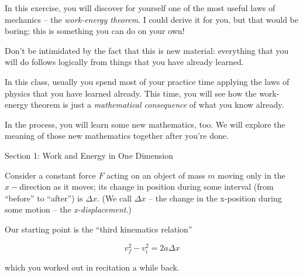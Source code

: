 \documentclass[12pt]{article}
\begin{document}

\centerline{\Large {}}


In this exercise, you will discover for yourself one of the most useful laws of mechanics -- the {\it work-energy theorem}. I could derive it for you, but that would be boring; this is something you can do on your own!



Don't be intimidated by the fact that this is new material: everything that you will do follows logically from things that you have already learned.

In this class, usually you spend most of your practice time applying the laws of physics that you have learned already. This time, you will see how the work-energy theorem is just a {\it mathematical consequence} of what you know already. 

In the process, you will learn some new mathematics, too. We will explore the meaning of those new mathematics together after you're done.
\bigskip
\bigskip\newpage

{\Large Section 1: Work and Energy in One Dimension}

Consider a constant force $F$ acting on an object of mass $m$ moving only in the $x-$direction as it moves; its change in position during some interval (from ``before'' to ``after'') is $\Delta x$. (We call $\Delta x$ -- the change in the x-position during some 
motion -- the {\it x-displacement}.)

Our starting point is the ``third kinematics relation''

$$ v_f^2 - v_i^2 = 2 a \Delta x$$

which you worked out in recitation a while back.
\end{document}
